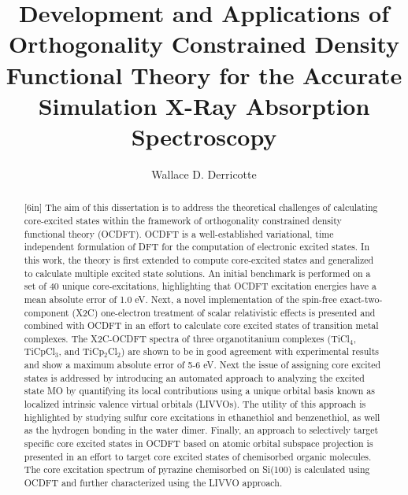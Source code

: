 \documentclass[final]{emory}
\title{Development and Applications of Orthogonality Constrained Density Functional Theory for the Accurate Simulation X-Ray Absorption Spectroscopy}
\author{Wallace D. Derricotte}                      %
\begin{document}
\begin{abstract}[6in]%
The aim of this dissertation is to address the theoretical challenges of calculating core-excited states within the framework of orthogonality constrained density functional theory (OCDFT). OCDFT is a well-established variational, time independent formulation of DFT for the computation of electronic excited states. In this work, the theory is first extended to compute core-excited states and generalized to calculate multiple excited state solutions. An initial benchmark is performed on a set of 40 unique core-excitations, highlighting that OCDFT excitation energies have a mean absolute error of 1.0 eV. Next, a novel implementation of the spin-free exact-two-component (X2C) one-electron treatment of scalar relativistic effects is presented and combined with OCDFT in an effort to calculate core excited states of transition metal complexes. The X2C-OCDFT spectra of three organotitanium complexes (TiCl$_4$, TiCpCl$_3$, and TiCp$_2$Cl$_2$) are shown to be in good agreement with experimental results and show a maximum absolute error of 5-6 eV. Next the issue of assigning core excited states is addressed by introducing an automated approach to analyzing the excited state MO by quantifying its local contributions using a unique orbital basis known as localized intrinsic valence virtual orbitals (LIVVOs). The utility of this approach is highlighted by studying sulfur core excitations in ethanethiol and benzenethiol, as well as the hydrogen bonding in the water dimer. Finally, an approach to selectively target specific core excited states in OCDFT based on atomic orbital subspace projection is presented in an effort to target core excited states of chemisorbed organic molecules. The core excitation spectrum of pyrazine chemisorbed on Si(100) is calculated using OCDFT and further characterized using the LIVVO approach.
\end{abstract}
\end{document}
